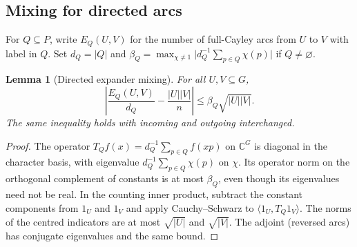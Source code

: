 \documentclass[11pt]{article}
\newtheorem{lemma}[theorem]{Lemma}
\theoremstyle{remark}\newtheorem{remark}[theorem]{Remark}
\newcommand{\abs}[1]{\lvert#1\rvert}
\newcommand{\C}{\mathbb C}
\begin{document}
\subsection{Mixing for directed arcs}
For $Q\subseteq P$, write $E_Q(U,V)$ for the number of full-Cayley arcs from $U$ to $V$ with label in $Q$. Set $d_Q=\abs Q$ and $\beta_Q=\max_{\chi\ne1}\abs{d_Q^{-1}\sum_{p\in Q}\chi(p)}$ if $Q\ne\varnothing$.
\begin{lemma}[Directed expander mixing]\label{lem:mix}
For all $U,V\subseteq G$,
\begin{equation}\label{eq:mix}
 \left|\frac{E_Q(U,V)}{d_Q}-\frac{\abs U\abs V}{n}\right|
 \le\beta_Q\sqrt{\abs U\abs V}.
\end{equation}
The same inequality holds with incoming and outgoing interchanged.
\end{lemma}
\begin{proof}
The operator $T_Qf(x)=d_Q^{-1}\sum_{p\in Q}f(xp)$ on $\C^G$ is diagonal in the character basis, with eigenvalue $d_Q^{-1}\sum_{p\in Q}\chi(p)$ on $\chi$. Its operator norm on the orthogonal complement of constants is at most $\beta_Q$, even though its eigenvalues need not be real. In the counting inner product, subtract the constant components from $1_U$ and $1_V$ and apply Cauchy--Schwarz to $\langle 1_U,T_Q1_V\rangle$. The norms of the centred indicators are at most $\sqrt{\abs U}$ and $\sqrt{\abs V}$. The adjoint (reversed arcs) has conjugate eigenvalues and the same bound.
\end{proof}
\end{document}
